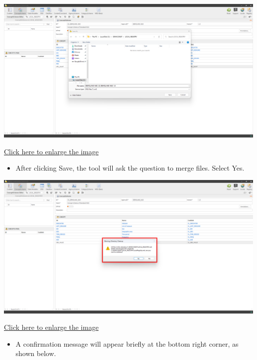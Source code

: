 \documentclass[
]{book}
\providecommand{\tightlist}{%
  \setlength{\itemsep}{0pt}\setlength{\parskip}{0pt}}
\begin{document}
\begin{center}\includegraphics[width=1\linewidth]{./images/image123} \end{center}

\href{images/image123.png}{Click here to enlarge the image}

\begin{itemize}
\tightlist
\item
  After clicking Save, the tool will ask the question to merge files. Select Yes.
\end{itemize}

\begin{center}\includegraphics[width=1\linewidth]{./images/image125} \end{center}

\href{images/image125.png}{Click here to enlarge the image}

\begin{itemize}
\tightlist
\item
  A confirmation message will appear briefly at the bottom right corner, as shown below.
\end{itemize}
\end{document}

